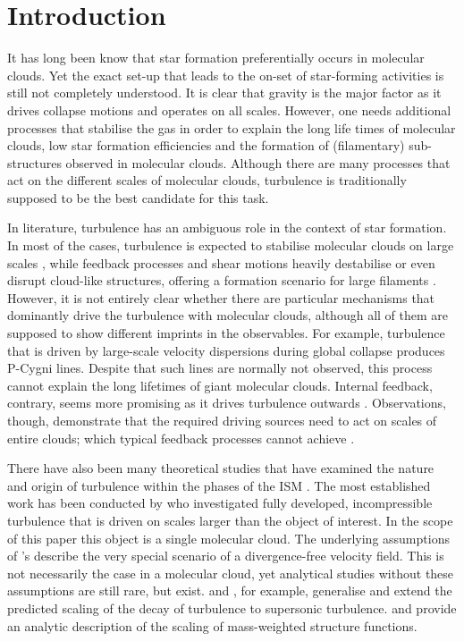 \section{Introduction}\label{intro}

It has long been know that star formation preferentially occurs in molecular clouds. 
Yet the exact set-up that leads to the on-set of star-forming activities is still not completely understood.
It is clear that gravity is the major factor as it drives collapse motions and operates on all scales.
However, one needs additional processes that stabilise the gas in order to explain the long life times of molecular clouds, low star formation efficiencies and the formation of (filamentary) sub-structures observed in molecular clouds. 
Although there are many processes that act on the different scales of molecular clouds, turbulence is traditionally supposed to be the best candidate for this task.

In literature, turbulence has an ambiguous role in the context of star formation. 
In most of the cases, turbulence is expected to stabilise molecular clouds on large scales \citep{Fleck1980,McKee1992,MacLow2003}, while feedback processes and shear motions heavily destabilise or even disrupt cloud-like structures, offering a formation scenario for large filaments \citep{Tan2013,Miyamoto2014}. 
However, it is not entirely clear whether there are particular mechanisms that dominantly drive the turbulence with molecular clouds, although all of them are supposed to show different imprints in the observables. 
For example, turbulence that is driven by large-scale velocity dispersions during global collapse \citep{Ballesteros2011a,Ballesteros2011b,Hartmann2012} produces P-Cygni lines. 
Despite that such lines are normally not observed, this process cannot explain the long lifetimes of giant molecular clouds. 
Internal feedback, contrary, seems more promising as it drives turbulence outwards \citep{Dekel2013,Krumholz2014}.
Observations, though, demonstrate that the required driving sources need to act on scales of entire clouds; which typical feedback processes cannot achieve \citep{Brunt2009,Brunt2013,Heyer2004}.

There have also been many theoretical studies that have examined the nature and origin of turbulence within the phases of the ISM \citep[and references within]{MacLow2004}. 
The most established work has been conducted by \citet{Kolmogorov1941} who investigated fully developed, incompressible turbulence that is driven on scales larger than the object of interest.
In the scope of this paper this object is a single molecular cloud. 
The underlying assumptions of \citeauthor{Kolmogorov1941}'s describe the very special scenario of a divergence-free velocity field. 
This is not necessarily the case in a molecular cloud, yet analytical studies without these assumptions are still rare, but exist. 
\citet{She1994} and \citet{Boldyrev2002}, for example, generalise and extend the predicted scaling of the decay of turbulence to supersonic turbulence.
\citet{Galtier2011} and \citet{Banerjee2013} provide an analytic description of the scaling of mass-weighted structure functions.

